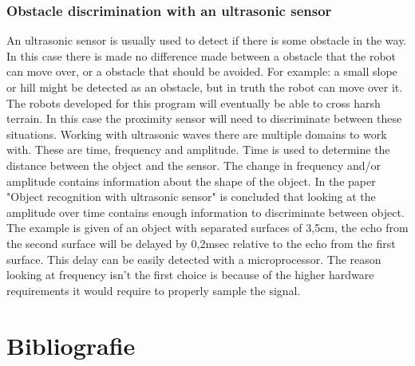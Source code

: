 \documentclass[10pt,a4paper]{article}
\begin{document}
\subsubsection{Obstacle discrimination with an ultrasonic sensor}
An ultrasonic sensor is usually used to detect if there is some obstacle in the way. In this case there is made no difference made between a obstacle that the robot can move over, or a obstacle that should be avoided. For example: a small slope or hill might be detected as an obstacle, but in truth the robot can move over it. The robots developed for this program will eventually be able to cross harsh terrain. In this case the proximity sensor will need to discriminate between these situations. Working with ultrasonic waves there are multiple domains to work with. These are time, frequency and amplitude. Time is used to determine the distance between the object and the sensor. The change in frequency and/or amplitude contains information about the shape of the object\cite{ultraobject}. 
In the paper "Object recognition with ultrasonic sensor" is concluded 
that looking at the amplitude over time contains enough information to discriminate between object\cite{ultraobject}. The example is given of an object with separated surfaces of 3,5cm, the echo from the second surface will be delayed by 0,2msec relative to the echo from the first surface. This delay can be easily detected with a microprocessor. The reason looking at frequency isn't the first choice is because of the higher hardware requirements it would require to properly sample the signal. 
\\

\newpage

\section{Bibliografie}


\end{document}
